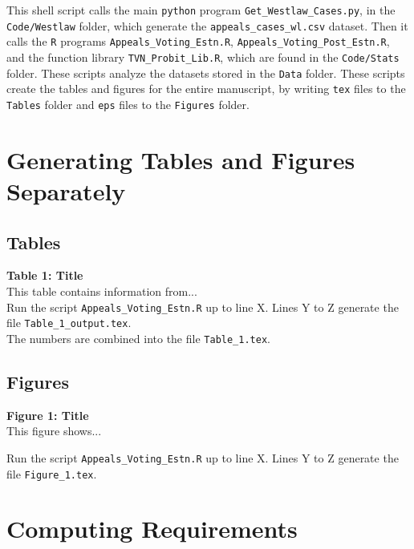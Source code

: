 \documentclass[11pt]{paper}
\begin{document}
This shell script calls the main 
\texttt{python} program \texttt{Get\_Westlaw\_Cases.py}, 
in the \texttt{Code/Westlaw} folder, 
which generate the \texttt{appeals\_cases\_wl.csv} dataset. 
Then it calls the 
\texttt{R} programs 
\texttt{Appeals\_Voting\_Estn.R}, \texttt{Appeals\_Voting\_Post\_Estn.R}, 
and the function library \texttt{TVN\_Probit\_Lib.R}, 
which are found in the \texttt{Code/Stats} folder. 
These scripts analyze the datasets stored in the \texttt{Data} folder. 
These scripts create the tables and figures for the entire manuscript,
by writing \texttt{tex} files to the \texttt{Tables} folder and
 \texttt{eps} files to the \texttt{Figures} folder. 



  

\section*{Generating Tables and Figures Separately}

\subsection*{Tables}

\noindent\textbf{Table 1: Title} \\

This table contains information from... \\

Run the script \texttt{Appeals\_Voting\_Estn.R} up to line X. 
Lines Y to Z generate the file \texttt{Table\_1\_output.tex}. \\

The numbers are combined into the file \texttt{Table\_1.tex}. \\


\subsection*{Figures}

\noindent\textbf{Figure 1: Title} \\

This figure shows...

Run the script \texttt{Appeals\_Voting\_Estn.R} up to line X. 
Lines Y to Z generate the file \texttt{Figure\_1.tex}. \\


\section*{Computing Requirements}
\end{document}
